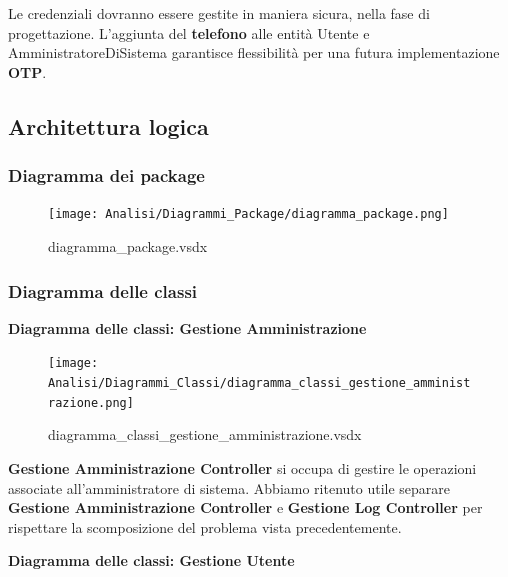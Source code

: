 \documentclass[a4paper]{article}
\begin{document}
Le credenziali dovranno essere gestite in maniera sicura, nella fase di progettazione. L'aggiunta del \textbf{telefono} alle entità Utente e AmministratoreDiSistema garantisce flessibilità per una futura implementazione \textbf{OTP}.

\newpage

\subsection{Architettura logica}

\subsubsection{Diagramma dei package}


\begin{figure}[H]
    \texttt{[image: Analisi/Diagrammi\_Package/diagramma\_package.png]}
    \centering
    \caption{diagramma\_package.vsdx}
\end{figure}


\newpage

\subsubsection{Diagramma delle classi}

\textbf{Diagramma delle classi: Gestione Amministrazione}

\begin{figure}[H]
    \texttt{[image: Analisi/Diagrammi\_Classi/diagramma\_classi\_gestione\_amministrazione.png]}
    \centering
    \caption{diagramma\_classi\_gestione\_amministrazione.vsdx}
\end{figure}

\textbf{Gestione Amministrazione Controller} si occupa di gestire le operazioni associate all'amministratore di sistema. Abbiamo ritenuto utile separare \textbf{Gestione Amministrazione Controller} e \textbf{Gestione Log Controller} per rispettare la scomposizione del problema vista precedentemente.

\newpage

\textbf{Diagramma delle classi: Gestione Utente}
\end{document}
